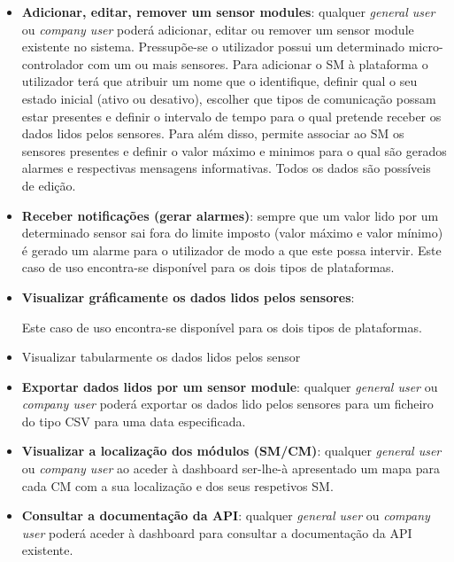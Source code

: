 \begin{itemize}
	\item \textbf{Adicionar, editar, remover um sensor modules}: qualquer \textit{general user} ou \textit{company user} poderá adicionar, editar ou remover um sensor module existente no sistema. Pressupõe-se o utilizador possui um determinado micro-controlador com um ou mais sensores. Para adicionar o \ac{SM} à plataforma o utilizador terá que atribuir um nome que o identifique, definir qual o seu estado inicial (ativo ou desativo), escolher que tipos de comunicação possam estar presentes e definir o intervalo de tempo para o qual pretende receber os dados lidos pelos sensores. Para além disso, permite associar ao \ac{SM} os sensores presentes e definir o valor máximo e minimos para o qual são gerados alarmes e respectivas mensagens informativas. Todos os dados são possíveis de edição.  
	

	
	\item \textbf{Receber notificações (gerar alarmes)}: sempre que um valor lido por um determinado sensor sai fora do limite imposto (valor máximo e valor mínimo) é gerado um alarme para o utilizador de modo a que este possa intervir. Este caso de uso encontra-se disponível para os dois tipos de plataformas. 
	
	
	\item \textbf{Visualizar gráficamente os dados lidos pelos sensores}: 
	
	
	Este caso de uso encontra-se disponível para os dois tipos de plataformas. 
	
	
	\item Visualizar tabularmente os dados lidos pelos sensor
	
	\item \textbf{Exportar dados lidos por um sensor module}: qualquer \textit{general user} ou \textit{company user} poderá exportar os dados lido pelos sensores para um ficheiro do tipo \ac{CSV} para uma data especificada.
	
	\item \textbf{Visualizar a localização dos módulos (SM/CM)}: qualquer \textit{general user} ou \textit{company user} ao aceder à dashboard ser-lhe-à apresentado um mapa para cada \ac{CM} com a sua localização e dos seus respetivos \ac{SM}. 
	
	
	\item \textbf{Consultar a documentação da API}: qualquer \textit{general user} ou \textit{company user} poderá aceder à dashboard para consultar a documentação da API existente. 
		

\end{itemize}
